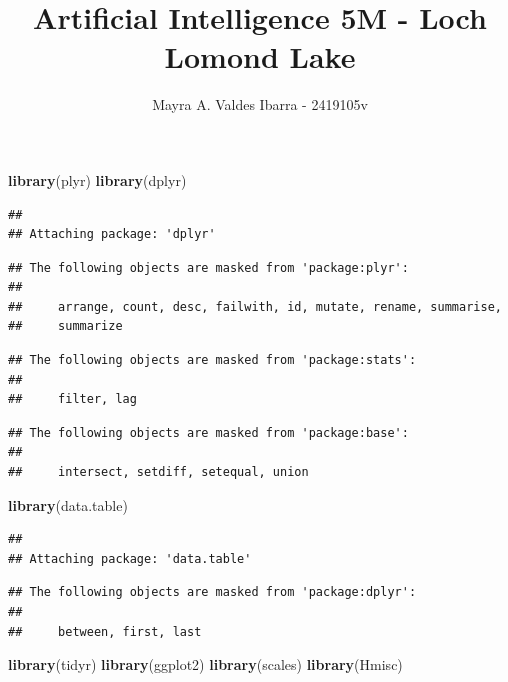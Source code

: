 \documentclass[11pt,]{article}
\title{Artificial Intelligence 5M - Loch Lomond Lake}
\author{Mayra A. Valdes Ibarra - 2419105v}
\date{}
\newenvironment{Shaded}{\begin{snugshade}}{\end{snugshade}}
\newcommand{\KeywordTok}[1]{\textcolor[rgb]{0.13,0.29,0.53}{\textbf{#1}}}
\newcommand{\NormalTok}[1]{#1}
\begin{document}
\maketitle

\begin{Shaded}
\begin{Highlighting}[]
\KeywordTok{library}\NormalTok{(plyr)}
\KeywordTok{library}\NormalTok{(dplyr)}
\end{Highlighting}
\end{Shaded}

\begin{verbatim}
## 
## Attaching package: 'dplyr'
\end{verbatim}

\begin{verbatim}
## The following objects are masked from 'package:plyr':
## 
##     arrange, count, desc, failwith, id, mutate, rename, summarise,
##     summarize
\end{verbatim}

\begin{verbatim}
## The following objects are masked from 'package:stats':
## 
##     filter, lag
\end{verbatim}

\begin{verbatim}
## The following objects are masked from 'package:base':
## 
##     intersect, setdiff, setequal, union
\end{verbatim}

\begin{Shaded}
\begin{Highlighting}[]
\KeywordTok{library}\NormalTok{(data.table)}
\end{Highlighting}
\end{Shaded}

\begin{verbatim}
## 
## Attaching package: 'data.table'
\end{verbatim}

\begin{verbatim}
## The following objects are masked from 'package:dplyr':
## 
##     between, first, last
\end{verbatim}

\begin{Shaded}
\begin{Highlighting}[]
\KeywordTok{library}\NormalTok{(tidyr)}
\KeywordTok{library}\NormalTok{(ggplot2)}
\KeywordTok{library}\NormalTok{(scales)}
\KeywordTok{library}\NormalTok{(Hmisc)}
\end{Highlighting}
\end{Shaded}
\end{document}
